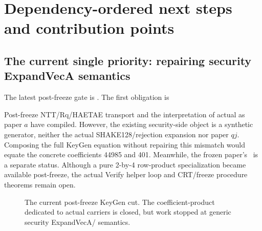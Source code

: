 \section{Dependency-ordered next steps and contribution points}
\label{sec:roadmap}

\subsection{The current single priority: repairing security ExpandVecA semantics}

The latest post-freeze gate is \CurrentGate. The first obligation is
\begin{quote}
\CurrentPriority
\end{quote}
Post-freeze NTT/Rq/HAETAE transport and the interpretation of actual
 as paper \(a\) have compiled. However, the existing security-side
object is a synthetic generator, neither the actual SHAKE128/rejection expansion
nor paper \(qj\). Composing the full KeyGen equation without repairing this mismatch
would equate the concrete coefficients 44985 and 401. Meanwhile, the frozen
paper's \FrozenPaperGate\ is a separate status. Although a pure 2-by-4 row-product
specialization became available post-freeze, the actual Verify helper loop and
CRT/freeze procedure theorems remain open.

\begin{figure}[ht]
\centering
{}
\caption{The current post-freeze KeyGen cut. The coefficient-product dedicated to
actual carriers is closed, but work stopped at generic security
ExpandVecA/ semantics.}
\label{fig:next-order}
\end{figure}

